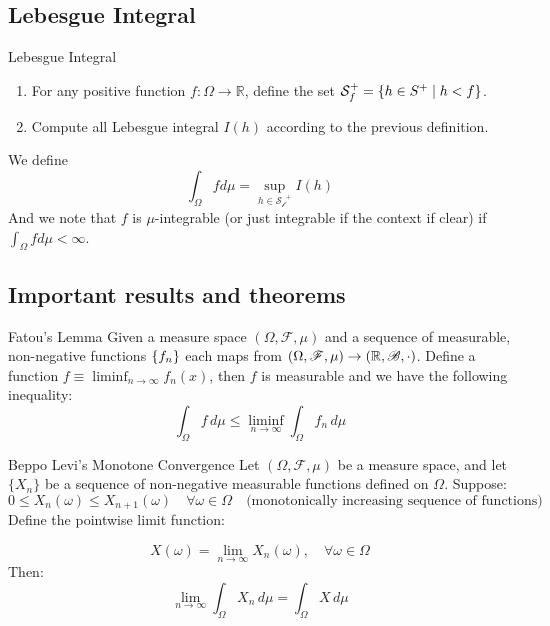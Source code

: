 \subsection{Lebesgue Integral}
\begin{df}{Lebesgue Integral}
\begin{enumerate}
	\item For any positive function \( f: \Omega \to \mathbb{R} \), define the set $\mathcal{S}^+_f = \qty{h\in S^+\mid h<f}$.
	\item Compute all Lebesgue integral $I(h)$ according to the previous definition. 
\end{enumerate}
We define 
$$\int_\Omega fd\mu = \sup_{h\in \mathcal{S_f}^+} I(h)$$
And we note that $f$ is $\mu$-integrable (or just integrable if the context if clear) if $\int_\Omega fd\mu <\infty$. 
\end{df}




\subsection{Important results and theorems}

\begin{lem}{Fatou's Lemma}
\noindent Given a measure space $(\Omega, \mathscr{F}, \mu)$ and a sequence of measurable, non-negative functions $\qty{f_n}$ each maps from $(\Omega, \mathscr{F}, \mu) \rightarrow ({\mathbb{R}}, \mathscr{B}, \cdot)$. Define a function $f \equiv \liminf_{n\to \infty} f_n(x)$, then $f$ is measurable and we have the following inequality: 
$$\int_\Omega f \, d\mu \leq \liminf_{n\to\infty} \int_\Omega f_n \, d\mu$$
\end{lem}

\begin{cor}{Beppo Levi's Monotone Convergence}
Let \((\Omega, \mathscr{F}, \mu)\) be a measure space, and let $\{X_n\}$ be a sequence of non-negative measurable functions defined on $\Omega$. Suppose:
$$0 \leq X_n(\omega) \leq X_{n+1}(\omega) \quad \forall \omega \in \Omega \quad \text{(monotonically increasing sequence of functions)}$$
Define the pointwise limit function:

$$X(\omega) = \lim_{n \to \infty} X_n(\omega), \quad \forall \omega \in \Omega$$
Then:
$$\lim_{n \to \infty} \int_\Omega X_n \, d\mu = \int_\Omega X \, d\mu$$
\end{cor}

